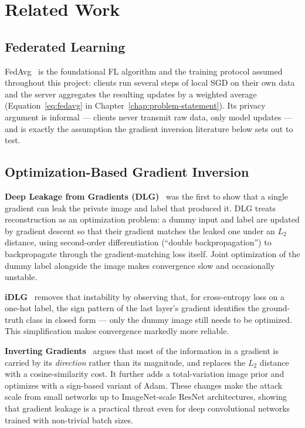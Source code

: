 \chapter{Related Work}
\label{chap:related-work}

\section{Federated Learning}

FedAvg~\cite{mcmahan2017fedavg} is the foundational FL algorithm and the
training protocol assumed throughout this project: clients run several
steps of local SGD on their own data and the server aggregates the
resulting updates by a weighted average (Equation~\ref{eq:fedavg} in
Chapter~\ref{chap:problem-statement}). Its privacy argument is informal ---
clients never transmit raw data, only model updates --- and is exactly the
assumption the gradient inversion literature below sets out to test.

\section{Optimization-Based Gradient Inversion}

\textbf{Deep Leakage from Gradients (DLG)}~\cite{zhu2019dlg} was the first
to show that a single gradient can leak the private image and label that
produced it. DLG treats reconstruction as an optimization problem: a dummy
input and label are updated by gradient descent so that their gradient
matches the leaked one under an $L_2$ distance, using second-order
differentiation (``double backpropagation'') to backpropagate through the
gradient-matching loss itself. Joint optimization of the dummy label
alongside the image makes convergence slow and occasionally unstable.

\textbf{iDLG}~\cite{zhao2020idlg} removes that instability by observing
that, for cross-entropy loss on a one-hot label, the sign pattern of the
last layer's gradient identifies the ground-truth class in closed form ---
only the dummy image still needs to be optimized. This simplification
makes convergence markedly more reliable.

\textbf{Inverting Gradients}~\cite{geiping2020inverting} argues that most
of the information in a gradient is carried by its \emph{direction} rather
than its magnitude, and replaces the $L_2$ distance with a
cosine-similarity cost. It further adds a total-variation image prior and
optimizes with a sign-based variant of Adam. These changes make the attack
scale from small networks up to ImageNet-scale ResNet architectures,
showing that gradient leakage is a practical threat even for deep
convolutional networks trained with non-trivial batch sizes.

